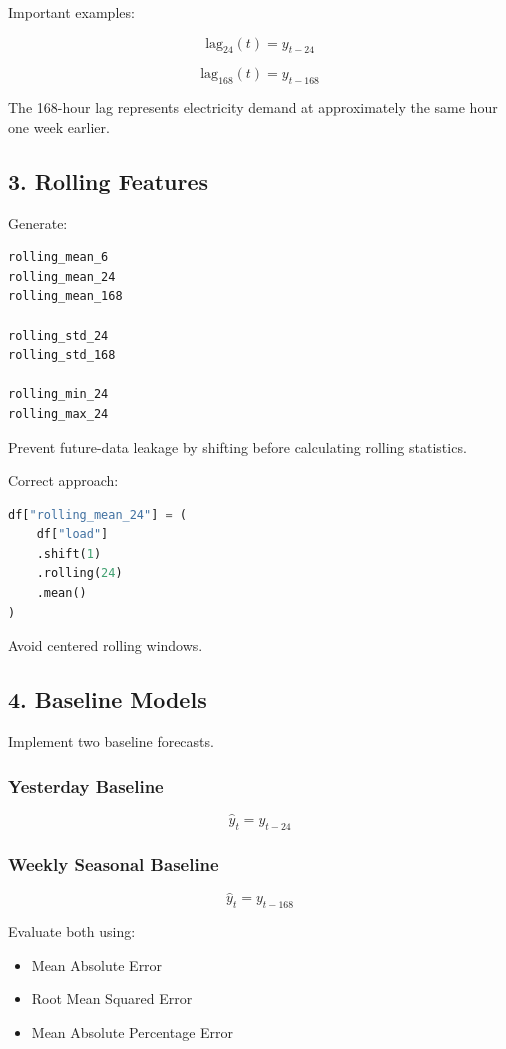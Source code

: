 \documentclass[11pt,a4paper]{article}
\begin{document}
Important examples:

\[
\text{lag}_{24}(t) = y_{t-24}
\]

\[
\text{lag}_{168}(t) = y_{t-168}
\]

The 168-hour lag represents electricity demand at approximately the same hour one week earlier.

\subsection{3. Rolling Features}

Generate:

\begin{lstlisting}
rolling_mean_6
rolling_mean_24
rolling_mean_168

rolling_std_24
rolling_std_168

rolling_min_24
rolling_max_24
\end{lstlisting}

Prevent future-data leakage by shifting before calculating rolling statistics.

Correct approach:

\begin{lstlisting}[language=Python]
df["rolling_mean_24"] = (
    df["load"]
    .shift(1)
    .rolling(24)
    .mean()
)
\end{lstlisting}

Avoid centered rolling windows.

\subsection{4. Baseline Models}

Implement two baseline forecasts.

\subsubsection{Yesterday Baseline}

\[
\hat{y}_t = y_{t-24}
\]

\subsubsection{Weekly Seasonal Baseline}

\[
\hat{y}_t = y_{t-168}
\]

Evaluate both using:

\begin{itemize}
    \item Mean Absolute Error
    \item Root Mean Squared Error
    \item Mean Absolute Percentage Error
\end{itemize}
\end{document}
